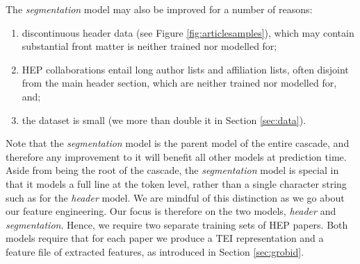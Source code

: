 The \emph{segmentation} model may also be improved for a number of reasons:

\begin{enumerate}
\item discontinuous header data (see Figure \ref{fig:articlesamples}), which may contain substantial front matter is neither trained nor modelled for;
\item HEP collaborations entail long author lists and affiliation lists, often disjoint from the main header section, which are neither trained nor modelled for, and;
\item the dataset is small (we more than double it in Section \ref{sec:data}).
\end{enumerate}

Note that the \emph{segmentation} model is the parent model of the entire cascade, and therefore any improvement to it will benefit all other models at prediction time. Aside from being the root of the cascade, the \emph{segmentation} model is special in that it models a full line at the token level, rather than a single character string such as for the \emph{header} model. We are mindful of this distinction as we go about our feature engineering. Our focus is therefore on the two models, \emph{header} and \emph{segmentation}. Hence, we require two separate training sets of HEP papers. Both models require that for each paper we produce a TEI representation and a feature file of extracted features, as introduced in Section \ref{sec:grobid}.

